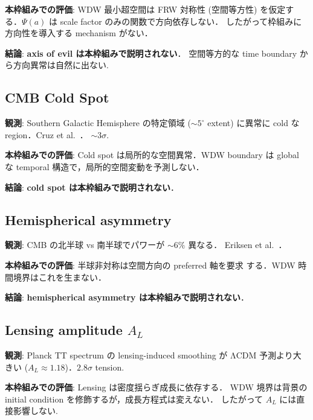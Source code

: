 \documentclass[11pt,a4paper]{article}
\begin{document}
\textbf{本枠組みでの評価}: WDW 最小超空間は FRW 対称性 (空間等方性)
を仮定する．$\Psi(a)$ は scale factor のみの関数で方向依存しない．
したがって枠組みに方向性を導入する mechanism がない．

\begin{tcolorbox}[colback=red!5,colframe=red!50!black]
\textbf{結論}: \textbf{axis of evil は本枠組みで説明されない}．
空間等方的な time boundary から方向異常は自然に出ない.
\end{tcolorbox}

\subsection{CMB Cold Spot}

\textbf{観測}: Southern Galactic Hemisphere の特定領域 ($\sim 5^\circ$
extent) に異常に cold な region．Cruz et al.~\cite{Cruz2005}．
$\sim 3\sigma$.

\textbf{本枠組みでの評価}: Cold spot は局所的な空間異常．WDW boundary
は global な temporal 構造で，局所的空間変動を予測しない．

\begin{tcolorbox}[colback=red!5,colframe=red!50!black]
\textbf{結論}: \textbf{cold spot は本枠組みで説明されない}．
\end{tcolorbox}

\subsection{Hemispherical asymmetry}

\textbf{観測}: CMB の北半球 vs 南半球でパワーが $\sim 6\%$ 異なる．
Eriksen et al.~\cite{Eriksen2004}．

\textbf{本枠組みでの評価}: 半球非対称は空間方向の preferred 軸を要求
する．WDW 時間境界はこれを生まない．

\begin{tcolorbox}[colback=red!5,colframe=red!50!black]
\textbf{結論}: \textbf{hemispherical asymmetry は本枠組みで説明されない}．
\end{tcolorbox}

\subsection{Lensing amplitude $A_L$}

\textbf{観測}: Planck TT spectrum の lensing-induced smoothing が
ΛCDM 予測より大きい ($A_L \approx 1.18$)．$2.8\sigma$ tension.

\textbf{本枠組みでの評価}: Lensing は密度揺らぎ成長に依存する．
WDW 境界は背景の initial condition を修飾するが，成長方程式は変えない．
したがって $A_L$ には直接影響しない.
\end{document}
